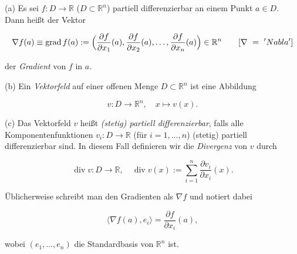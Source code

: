 \begin{definition}{}
(a) Es sei \( f : D \to \mathbb{R} \) ($D \subset \mathbb{R}^n$) partiell differenzierbar an einem Punkt \( a \in D \). Dann heißt der Vektor


\[
    \nabla f(a) \equiv \operatorname{grad} f(a) := \Bigl( \frac{\partial f}{\partial x_1}(a), \frac{\partial f}{\partial x_2}(a), \dots, \frac{\partial f}{\partial x_n}(a) \Bigr) \in \mathbb{R}^n \qquad [\nabla \ = \ 'Nabla']
\]

der \emph{Gradient} von \( f \) in \( a \).
\newline

(b) Ein \emph{Vektorfeld} auf einer offenen Menge \( D \subset \mathbb{R}^n \) ist eine Abbildung


\[
v: D \to \mathbb{R}^n,\quad x \mapsto v(x).
\]



(c) Das Vektorfeld \( v \) heißt \emph{(stetig) partiell differenzierbar}, falls alle Komponentenfunktionen \( v_i: D \to \mathbb{R} \) (für \( i=1,\dots,n \)) (stetig) partiell differenzierbar sind. In diesem Fall definieren wir die \emph{Divergenz} von \( v \) durch


\[
\operatorname{div} v : D \rightarrow \mathbb{R}, \quad
\operatorname{div} v(x) := \sum_{i=1}^n \frac{\partial v_i}{\partial x_i}(x).
\]


\end{definition}

\begin{bemerkungbox}
Üblicherweise schreibt man den Gradienten als \(\nabla f\) und notiert dabei


\[
\langle \nabla f(a), e_i \rangle = \frac{\partial f}{\partial x_i}(a),
\]


wobei \((e_1, \dots, e_n)\) die Standardbasis von \(\mathbb{R}^n\) ist.
\end{bemerkungbox}

